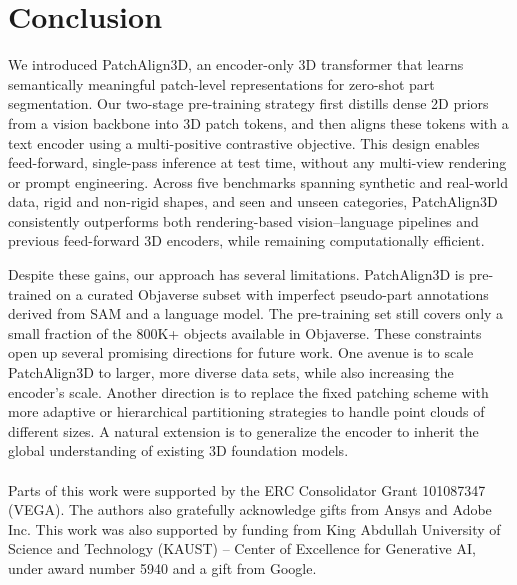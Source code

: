 \section{Conclusion}
\label{sec:conclusion}

We introduced PatchAlign3D, an encoder-only 3D transformer that learns semantically meaningful patch-level representations for zero-shot part segmentation. Our two-stage pre-training strategy first distills dense 2D priors from a vision backbone into 3D patch tokens, and then aligns these tokens with a text encoder using a multi-positive contrastive objective. This design enables feed-forward, single-pass inference at test time, without any multi-view rendering or prompt engineering. Across five benchmarks spanning synthetic and real-world data, rigid and non-rigid shapes, and seen and unseen categories, PatchAlign3D consistently outperforms both rendering-based vision--language pipelines and previous feed-forward 3D encoders, while remaining computationally efficient.

Despite these gains, our approach has several limitations. PatchAlign3D is pre-trained on a curated Objaverse subset with imperfect pseudo-part annotations derived from SAM and a language model. The pre-training set still covers only a small fraction of the 800K+ objects available in Objaverse.
These constraints open up several promising directions for future work. One avenue is to scale PatchAlign3D to larger, more diverse data sets, while also increasing the encoder's scale. Another direction is to replace the fixed patching scheme with more adaptive or hierarchical partitioning strategies to handle point clouds of different sizes. A natural extension is to generalize the encoder to inherit the global understanding of existing 3D foundation models.
\\
\\
 Parts of this work were supported by the ERC Consolidator Grant 101087347 (VEGA). The authors also gratefully acknowledge gifts from Ansys and Adobe Inc. This work was also supported by funding from King Abdullah University of Science and Technology (KAUST) – Center of Excellence for Generative AI, under award number 5940 and a gift from Google.
